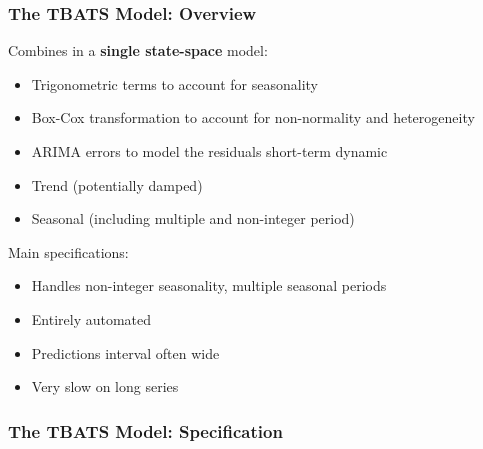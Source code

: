 \documentclass{beamer}
\newenvironment{wideitemize}{\itemize\addtolength{\itemsep}{10pt}}{\enditemize}
\begin{document}
    
  \begin{frame}
    \frametitle{The TBATS Model: Overview}

    \begin{wideitemize}
    \item Combines in a \textbf{single state-space} model:

      \begin{itemize}
      \item Trigonometric terms to account for seasonality
      \item Box-Cox transformation to account for non-normality and heterogeneity
      \item ARIMA errors to model the residuals short-term dynamic
      \item Trend (potentially damped)        
      \item Seasonal (including multiple and non-integer period)
      \end{itemize}

    \item Main specifications:
      \begin{itemize}
      \item Handles non-integer seasonality, multiple seasonal periods
      \item Entirely automated
      \item Predictions interval often wide
      \item Very slow on long series
      \end{itemize}      
    \end{wideitemize}
    \end{frame}

    
    \begin{frame}
      \frametitle{The TBATS Model: Specification}
    \end{frame}
\end{document}
